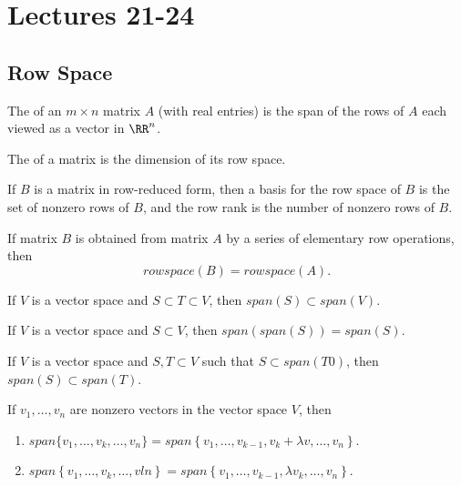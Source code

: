 \section{Lectures 21-24}
\subsection{Row Space}
\begin{definition}
  The  of an $m \times n$ matrix $A$ (with real entries) is the span of the rows of $A$
  each viewed as a vector in $\RR^{n}$.
\end{definition}

\begin{definition}
  The  of a matrix is the dimension of its row space.
\end{definition}

\begin{theorem}
  If $B$ is a matrix in row-reduced form, then a basis for the row space of $B$ is the set of nonzero rows 
  of $B$, and the row rank is the number of nonzero rows of $B$.
\end{theorem}

\begin{theorem}
  If matrix $B$ is obtained from matrix $A$ by a series of elementary row operations, then 
  \begin{equation*}
    rowspace(B) = rowspace(A).
  \end{equation*}
\end{theorem}

\begin{lemma}
  If $V$ is a vector space and $S \subset T \subset V$, then $span(S) \subset span(V)$.
\end{lemma}

\begin{lemma}
  If $V$ is a vector space and $S \subset V$, then $span(span(S)) = span(S)$.
\end{lemma}

\begin{lemma}
  If $V$ is a vector space and $S, T \subset V$ such that $S \subset span(T0)$, then $span(S) \subset span(T)$.
\end{lemma}

\begin{lemma}
  If $v_{1}, \dots, v_{n}$ are nonzero vectors in the vector space $V$, then
  \begin{enumerate}
    \item $span\{v_{1}, \dots, v_{k}, \dots, v_{n}\} = span \left\{v_{1}, \dots, v_{k - 1}, v_{k} + \lambda v, \dots, v_{n}\right\}$.
    \item $span \left\{v_{1}, \dots, v_{k}, \dots, vln\right\} = span \left\{v_{1}, \dots, v_{k - 1}, \lambda v_{k}, \dots, v_{n}\right\}$.
  \end{enumerate}
\end{lemma}

